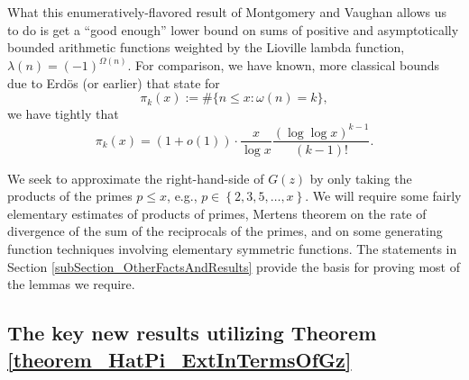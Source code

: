 \documentclass[11pt,reqno,a4letter]{article}
\numberwithin{figure}{section}
\numberwithin{table}{section}
\theoremstyle{plain}
\numberwithin{theorem}{section}
\theoremstyle{definition}
\begin{document}
What this enumeratively-flavored result of Montgomery and Vaughan allows us to do is get a 
``good enough'' lower bound on sums of positive and asymptotically bounded arithmetic functions 
weighted by the Lioville lambda function, $\lambda(n) = (-1)^{\Omega(n)}$. 
For comparison, we have known, more classical bounds due to Erd\"os (or earlier) that state for 
\[
\pi_k(x) := \#\{n \leq x: \omega(n) = k\}, 
\]
we have tightly that \cite{TODO,MV} 
\[
\pi_k(x) = (1 + o(1)) \cdot \frac{x}{\log x} \frac{(\log\log x)^{k-1}}{(k-1)!}. 
\] 

We seek to approximate the right-hand-side of $G(z)$ by only taking the products of the primes 
$p \leq x$, e.g., $p \in \left\{2,3,5,\ldots,x\right\}$. 
We will require some fairly elementary estimates of products of primes, Mertens theorem on the 
rate of divergence of the sum of the reciprocals of the primes, and on some generating function 
techniques involving elementary symmetric functions. 
The statements in Section \ref{subSection_OtherFactsAndResults} provide the basis for proving 
most of the lemmas we require. 

\subsection{The key new results utilizing Theorem \ref{theorem_HatPi_ExtInTermsOfGz}} 
\end{document}

